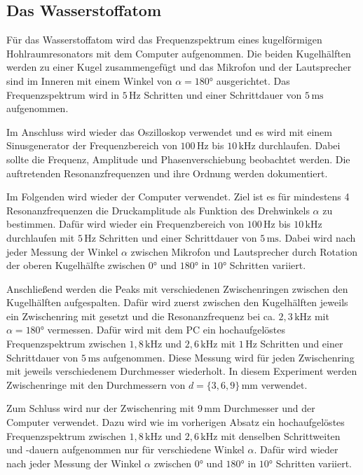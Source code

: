 \subsection{Das Wasserstoffatom}
\label{sec:d_H}

Für das Wasserstoffatom wird das Frequenzspektrum eines kugelförmigen Hohlraumresonators mit dem Computer aufgenommen. Die beiden Kugelhälften werden zu einer Kugel zusammengefügt und das Mikrofon und der Lautsprecher sind im Inneren mit einem Winkel von $\alpha = 180°$ ausgerichtet. Das Frequenzspektrum wird in $5 \, \mathrm{Hz}$ Schritten und einer Schrittdauer von $5 \, \mathrm{ms}$ aufgenommen. \newline

Im Anschluss wird wieder das Oszilloskop verwendet und es wird mit einem Sinusgenerator der Frequenzbereich von $100 \, \mathrm{Hz}$ bis $10 \, \mathrm{kHz}$ durchlaufen. Dabei sollte die Frequenz, Amplitude und Phasenverschiebung beobachtet werden. Die auftretenden Resonanzfrequenzen und ihre Ordnung werden dokumentiert. \newline

Im Folgenden wird wieder der Computer verwendet. Ziel ist es für mindestens 4 Resonanzfrequenzen die Druckamplitude als Funktion des Drehwinkels $\alpha$ zu bestimmen. Dafür wird wieder ein Frequenzbereich von $100 \, \mathrm{Hz}$ bis $10 \, \mathrm{kHz}$ durchlaufen mit $5 \, \mathrm{Hz}$ Schritten und einer Schrittdauer von $5 \, \mathrm{ms}$. Dabei wird nach jeder Messung der Winkel $\alpha$ zwischen Mikrofon und Lautsprecher durch Rotation der oberen Kugelhälfte zwischen $0°$ und $180°$ in $10°$ Schritten variiert. \newline

Anschließend werden die Peaks mit verschiedenen Zwischenringen zwischen den Kugelhälften aufgespalten. Dafür wird zuerst zwischen den Kugelhälften jeweils ein Zwischenring mit gesetzt und die Resonanzfrequenz bei ca. $2, \! 3 \, \mathrm{kHz}$ mit $\alpha = 180°$ vermessen. Dafür wird mit dem PC ein hochaufgelöstes Frequenzspektrum zwischen $1, \! 8 \, \mathrm{kHz}$ und $2, \! 6 \, \mathrm{kHz}$ mit $1 \, \mathrm{Hz}$ Schritten und einer Schrittdauer von $5 \, \mathrm{ms}$ aufgenommen. Diese Messung wird für jeden Zwischenring mit jeweils verschiedenem Durchmesser wiederholt. In diesem Experiment werden Zwischenringe mit den Durchmessern von $d = \{ 3, 6, 9 \} \, \mathrm{mm}$ verwendet. \newline

Zum Schluss wird nur der Zwischenring mit $9 \, \mathrm{mm}$ Durchmesser und der Computer verwendet. Dazu wird wie im vorherigen Absatz ein hochaufgelöstes Frequenzspektrum zwischen $1, \! 8 \, \mathrm{kHz}$ und $2, \! 6 \, \mathrm{kHz}$ mit denselben Schrittweiten und -dauern aufgenommen nur für verschiedene Winkel $\alpha$. Dafür wird wieder nach jeder Messung der Winkel $\alpha$ zwischen $0°$ und $180°$ in $10°$ Schritten variiert.

